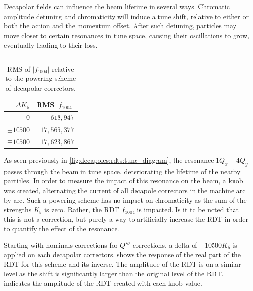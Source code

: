 \section{}

Decapolar fields can influence the beam lifetime in several ways. Chromatic amplitude detuning and
chromaticity will induce a tune shift, relative to either or both the action and the momentum
offset. After such detuning, particles may move closer to certain resonances in tune space, causing
their oscillations to grow, eventually leading to their loss.


\subsection{}

\begin{table}
    \centering
    \begin{tabular}{rr}
    \toprule
    $\Delta K_5$         & RMS $|f_{1004}|$ \\
    \midrule
    $0$                  &            $618,947$ \\
    $\pm10500$             &         $17,566,377$ \\
    $\mp10500$             &         $17,623,867$ \\
    \bottomrule
    \end{tabular}
    \caption{RMS of $|f_{1004}|$ relative to the powering scheme of decapolar correctors.}
    \label{table:decapoles:impact:rdt_amplitude}
\end{table}

As seen previously in \cref{fig:decapoles:rdts:tune_diagram}, the resonance $1Q_x - 4Q_y$ passes
through the beam in tune space, deteriorating the lifetime of the nearby particles.
In order to measure the impact of this resonance on the beam, a knob was created, alternating the 
current of all decapole correctors in the machine arc by arc. Such a powering scheme has no impact
on chromaticity as the sum of the strengths $K_5$ is zero. Rather, the RDT $f_{1004}$ is impacted.
Is it to be noted that this is not a correction, but purely a way to artificially increase the RDT
in order to quantify the effect of the resonance.

Starting with nominals corrections for $Q'''$ corrections, a delta of $\pm 10500 K_5$ is applied on
each decapolar correctors.  shows the response of the
real part of the RDT for this scheme and its inverse. The amplitude of the RDT is on a similar level
as the shift is significantly larger than the original level of the RDT.
 indicates the amplitude of the RDT created with each
knob value.

